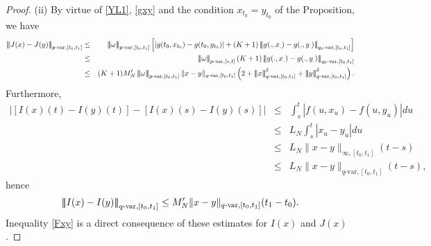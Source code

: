 \documentclass[10pt]{article}
\numberwithin{equation}{section} %
\newcommand{\ltn}{\ensuremath{\left| \! \left| \! \left|}}
\newcommand{\rtn}{\ensuremath{\right| \! \right| \! \right|}}
\newtheorem{proposition}[theorem]{Proposition}
\begin{document}
\begin{proof}
(ii) By virtue of \eqref{YL1}, \eqref{gxy}  and the condition $x_{t_0} =y_{t_0}$ of the Proposition, we have
	\begin{eqnarray*}
	\ltn J(x)-J(y)\rtn_{p\text{-var},[t_0,t_{1}]}&\leq& \ltn\omega\rtn_{p\text{-var},[t_0,t_1]}\left[|g(t_0,x_{t_0}) - g(t_0,y_{t_0})|+ (K+1)\ltn g(.,x_.) - g(.,y_.)\rtn_{q_0\text{-var},[t_0,t_1]}\right]\\
	&\leq& \ltn\omega\rtn_{p\text{-var},[s,t]}(K+1)\ltn g(.,x_.) - g(.,y_.)\rtn_{q_0\text{-var},[t_0,t_1]}\\
	&\leq& (K+1)M'_N\ltn\omega\rtn_{p\text{-var},[t_0,t_1]}\|x-y\|_{q\text{-var},[t_0,t_{1}]} \left(2+\ltn x\rtn^{\delta}_{q\text{-var},[t_0,t_{1}]}+\ltn y\rtn^{\delta}_{q\text{-var},[t_0,t_{1}]}\right).
	\end{eqnarray*}
	Furthermore,
	\begin{eqnarray*}
	\left|[I(x)(t)-I(y)(t)]- [I(x)(s)-I(y)(s)]\right| &\leq &\int_s^t |f(u,x_u)-f(u,y_u)|du \\
	&\leq& L_N \int_s^t |x_u-y_u| du\\
	&\leq & L_N \|x-y\|_{\infty,[t_0,t_1]} (t-s)\\
	&\leq & L_N \|x-y\|_{q\text{-var},[t_0,t_1]} (t-s),
	\end{eqnarray*}
	hence 
	$$
	\ltn I(x)-I(y)\rtn_{q\text{-var},[t_0,t_1]} \leq M'_N \|x-y\|_{q\text{-var},[t_0,t_1]} (t_1-t_0).
	$$
Inequality \eqref{Fxy} is a direct consequence of these estimates for $I(x)$ and $J(x)$.
\end{proof}

\end{document}
